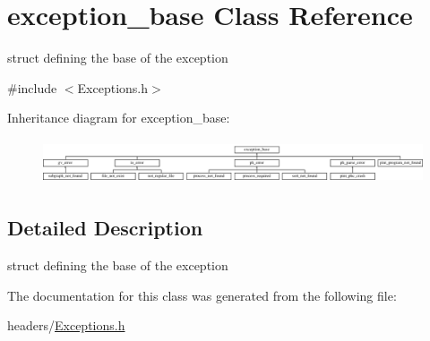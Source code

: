 \hypertarget{structexception__base}{\section{exception\-\_\-base \-Class \-Reference}
\label{structexception__base}
}


struct defining the base of the exception  




{\ttfamily \#include $<$\-Exceptions.\-h$>$}

\-Inheritance diagram for exception\-\_\-base\-:\begin{figure}[H]
\begin{center}
\leavevmode
\includegraphics[height=1.337580cm]{structexception__base}
\end{center}
\end{figure}


\subsection{\-Detailed \-Description}
struct defining the base of the exception 

\-The documentation for this class was generated from the following file\-:\begin{DoxyCompactItemize}
\item 
headers/\hyperlink{_exceptions_8h}{\-Exceptions.\-h}\end{DoxyCompactItemize}
